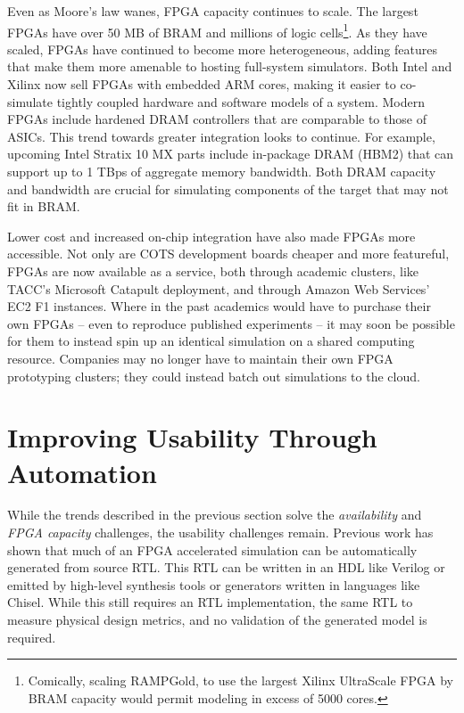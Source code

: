 Even as Moore's law wanes, FPGA capacity continues to scale. The largest FPGAs
have over 50 MB of BRAM and millions of logic cells\footnote{Comically, scaling
RAMPGold\cite{rampgold}, to use the largest Xilinx UltraScale
FPGA\cite{ultrascale} by BRAM capacity would permit modeling in excess of 5000
cores.}. As they have scaled, FPGAs have continued to become more
heterogeneous, adding features that make them more amenable to hosting
full-system simulators.  Both Intel and Xilinx now sell FPGAs with embedded ARM
cores, making it easier to co-simulate tightly coupled hardware and software
models of a system. Modern FPGAs include hardened DRAM controllers that are
comparable to those of ASICs. This trend towards greater integration looks to
continue. For example, upcoming Intel Stratix 10 MX parts include in-package DRAM (HBM2)
that can support up to 1 TBps of aggregate memory bandwidth\cite{stratix10mx}.
Both DRAM capacity and bandwidth are crucial for simulating components
of the target that may not fit in BRAM.

Lower cost and increased on-chip integration have also made FPGAs more
accessible. Not only are COTS development boards cheaper and more featureful,
FPGAs are now available as a service, both through academic clusters, like
TACC's Microsoft Catapult\cite{catapultannounce} deployment, and through Amazon
Web Services' EC2 F1 instances\cite{amazonf1}. Where in the past academics
would have to purchase their own FPGAs -- even to reproduce published
experiments -- it may soon be possible for them to instead spin up an identical
simulation on a shared computing resource. Companies may no longer have to
maintain their own FPGA prototyping clusters; they could instead batch out
simulations to the cloud.

\section{Improving Usability Through Automation}

While the trends described in the previous section solve the
\emph{availability} and \emph{FPGA capacity} challenges, the usability
challenges remain. Previous work\cite{fabscalarfpga, strober} has shown that
much of an FPGA accelerated simulation can be automatically generated from
source RTL. This RTL can be written in an HDL like Verilog or emitted by
high-level synthesis tools or generators written in languages like
Chisel\cite{chisel}. While this still requires an RTL implementation, the same
RTL to measure physical design metrics, and no validation of the generated
model is required.

